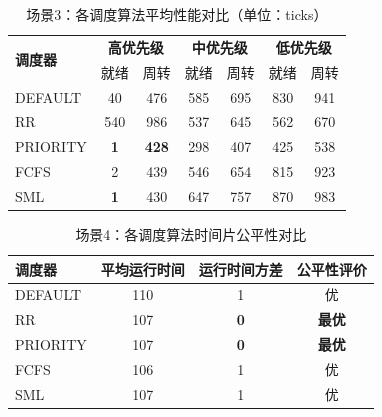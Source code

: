 \documentclass[a4paper, 12pt]{article}
\begin{document}
\begin{table}[H]
	\centering
	\caption{场景3：各调度算法平均性能对比（单位：ticks）}
	\begin{tabular}{l|cc|cc|cc}
		\toprule
		\multirow{2}{*}{\textbf{调度器}} & \multicolumn{2}{c|}{\textbf{高优先级}} & \multicolumn{2}{c|}{\textbf{中优先级}} & \multicolumn{2}{c}{\textbf{低优先级}} \\
		& 就绪 & 周转 & 就绪 & 周转 & 就绪 & 周转 \\
		\midrule
		DEFAULT  & 40 & 476 & 585 & 695 & 830 & 941 \\
		RR       & 540 & 986 & 537 & 645 & 562 & 670 \\
		PRIORITY & \textbf{1} & \textbf{428} & 298 & 407 & 425 & 538 \\
		FCFS     & 2 & 439 & 546 & 654 & 815 & 923 \\
		SML      & \textbf{1} & 430 & 647 & 757 & 870 & 983 \\
		\bottomrule
	\end{tabular}
\end{table}

\begin{table}[H]
	\centering
	\caption{场景4：各调度算法时间片公平性对比}
	\begin{tabular}{lccc}
		\toprule
		\textbf{调度器} & \textbf{平均运行时间} & \textbf{运行时间方差} & \textbf{公平性评价} \\
		\midrule
		DEFAULT  & 110 & 1 & 优 \\
		RR       & 107 & \textbf{0} & \textbf{最优} \\
		PRIORITY & 107 & \textbf{0} & \textbf{最优} \\
		FCFS     & 106 & 1 & 优 \\
		SML      & 107 & 1 & 优 \\
		\bottomrule
	\end{tabular}
\end{table}
\end{document}
